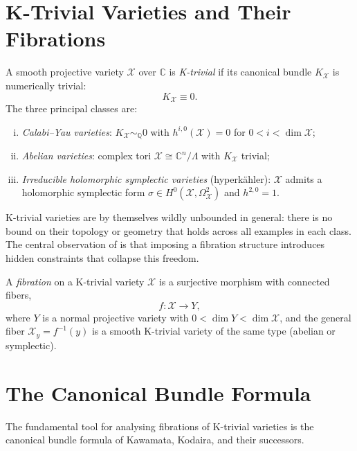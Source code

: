 \documentclass[11pt,openany]{book}
\begin{document}
\section{K-Trivial Varieties and Their Fibrations}
\label{sec:k-trivial}

\begin{definition}
A smooth projective variety $\mathcal{X}$ over $\mathbb{C}$
is \emph{K-trivial} if its canonical bundle $K_{\mathcal{X}}$
is numerically trivial:
\[
  K_{\mathcal{X}} \equiv 0.
\]
The three principal classes are:
\begin{enumerate}[(i)]
  \item \emph{Calabi--Yau varieties}: $K_{\mathcal{X}}
    \sim_{\mathbb{Q}} 0$ with $h^{i,0}(\mathcal{X}) = 0$
    for $0 < i < \dim \mathcal{X}$;
  \item \emph{Abelian varieties}: complex tori $\mathcal{X}
    \cong \mathbb{C}^n / \Lambda$ with $K_{\mathcal{X}}$
    trivial;
  \item \emph{Irreducible holomorphic symplectic varieties}
    (hyperkähler): $\mathcal{X}$ admits a holomorphic
    symplectic form $\sigma \in H^0(\mathcal{X},
    \Omega^2_{\mathcal{X}})$ and $h^{2,0} = 1$.
\end{enumerate}
\end{definition}

K-trivial varieties are by themselves wildly unbounded in
general: there is no bound on their topology or geometry
that holds across all examples in each class.  The central
observation of \citet{engel2025} is that imposing a
fibration structure introduces hidden constraints that
collapse this freedom.

\begin{definition}
A \emph{fibration} on a K-trivial variety $\mathcal{X}$ is
a surjective morphism with connected fibers,
\[
  f : \mathcal{X} \to Y,
\]
where $Y$ is a normal projective variety with
$0 < \dim Y < \dim \mathcal{X}$, and the general fiber
$\mathcal{X}_y = f^{-1}(y)$ is a smooth K-trivial variety
of the same type (abelian or symplectic).
\end{definition}

\section{The Canonical Bundle Formula}
\label{sec:canonical-bundle-formula}

The fundamental tool for analysing fibrations of K-trivial
varieties is the canonical bundle formula of Kawamata,
Kodaira, and their successors.
\end{document}
